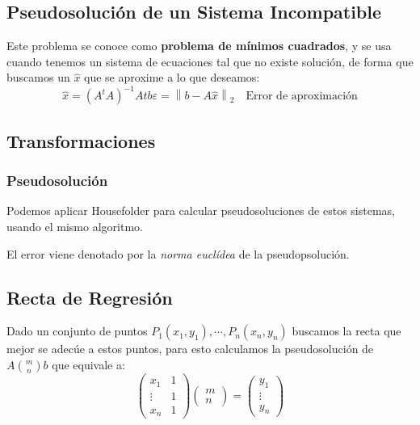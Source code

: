 \subsection{Pseudosolución de un Sistema Incompatible}
Este problema se conoce como \textbf{problema de mínimos cuadrados}, y se usa cuando tenemos un sistema de ecuaciones tal que no existe solución, de forma que buscamos un \(\hat{x}\) que se aproxime a lo que deseamos:
\[
        \boxed{\hat{x} = \left(A^tA\right)^{-1}At b }
        \boxed{\varepsilon = \left\lVert b - A \hat{x}\right\rVert_2}\hspace{1em} \text{Error de aproximación}
\]
\subsection{Transformaciones}
\subsubsection{Pseudosolución}
Podemos aplicar Housefolder para calcular pseudosoluciones de estos sistemas, usando el mismo algoritmo.
\par El error viene denotado por la \textit{norma euclídea} de la pseudopsolución.
\subsection{Recta de Regresión}
Dado un conjunto de puntos \(P_1(x_1, y_1), \cdots, P_n(x_n, y_n)\) buscamos la recta que mejor se adecúe a estos puntos, para esto calculamos la pseudosolución de \(A \binom{m}{n} b\) que equivale a:
\[
        \boxed{
                \begin{pmatrix}
                        x_1    & 1 \\
                        \vdots & 1 \\
                        x_n    & 1
                \end{pmatrix}
                \begin{pmatrix}
                        m
                        \\
                        n
                \end{pmatrix}
                =
                \begin{pmatrix}
                        y_1
                        \\
                        \vdots
                        \\
                        y_n
                \end{pmatrix}
        }\]